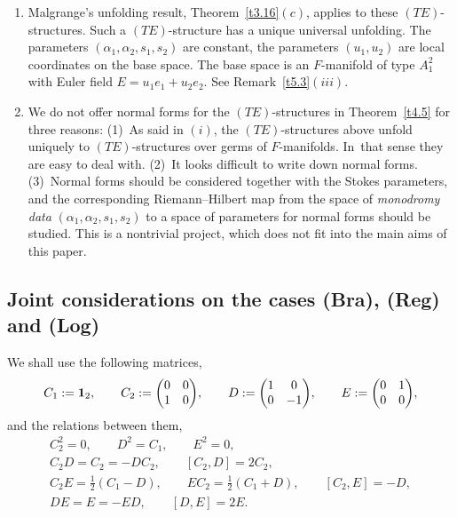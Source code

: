 \documentclass[pdftex]{sigma}%
\numberwithin{equation}{section}
\numberwithin{figure}{section}
\begin{document}
\begin{Remarks}%
\quad
\begin{enumerate}\itemsep=0pt
\item[$(i)$] Malgrange's unfolding result, Theorem~\ref{t3.16}$(c)$,
applies to these $(TE)$-structures.
Such a $(TE)$-structure has a unique universal unfolding.
The parameters $(\alpha_1,\alpha_2,s_1,s_2)$ are constant,
the parameters $(u_1,u_2)$ are local coordinates
on the base space. The base space is an $F$-manifold
of type $A_1^2$ with Euler field $E=u_1e_1+u_2e_2$.
See Remark~\ref{t5.3}$(iii)$.

\item[$(ii)$] We do not offer normal forms for the $(TE)$-structures
in Theorem~\ref{t4.5} for three reasons: (1)~As said in $(i)$,
the $(TE)$-structures above unfold uniquely to
$(TE)$-structures over germs of $F$-manifolds. In~that sense they are easy to deal with.
(2)~It looks difficult to write down normal forms.
(3)~Normal forms should be considered
together with the Stokes parameters, and the corresponding
Riemann--Hilbert map from the space of {\it monodromy data}
$(\alpha_1,\alpha_2,s_1,s_2)$ to a space of
parameters for normal forms should be studied.
This is a nontrivial project,
which does not fit into the main aims of this paper.
\end{enumerate}
\end{Remarks}

\subsection{Joint considerations on the cases (Bra), (Reg) and (Log)}%

\begin{Notation}%
We shall use the following matrices,
\begin{gather*}%
C_1:={\bf 1}_2,\qquad
C_2:=\begin{pmatrix}0&0\\1&0\end{pmatrix}\!,\qquad
D:=\begin{pmatrix}1&0\\0&-1\end{pmatrix}\!,\qquad
E:=\begin{pmatrix}0&1\\0&0\end{pmatrix}\!,
\end{gather*}
and the relations between them,
\begin{gather*}
C_2^2=0,\qquad D^2=C_1,\qquad E^2=0,%
\\[.5ex]
C_2D=C_2=-DC_2,\qquad [C_2,D]=2C_2,%
\\
C_2E=\frac{1}{2}(C_1-D),\qquad
EC_2=\frac{1}{2}(C_1+D),\qquad
[C_2,E]=-D,%
\\
DE=E=-ED,\qquad [D,E]=2E.%
\end{gather*}
\end{Notation}
\end{document}
